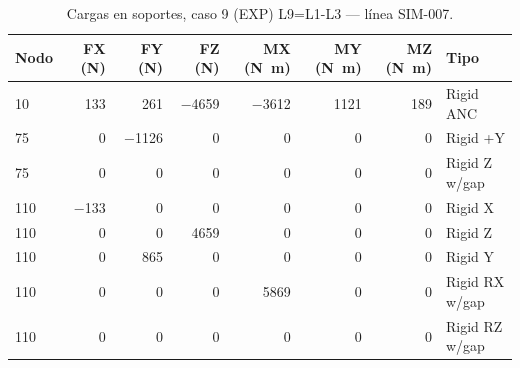 \begin{table}[htbp]
  \centering
  \footnotesize
  \caption{Cargas en soportes, caso 9 (EXP) L9=L1-L3 — línea SIM-007.}
  \label{tab:restricciones-exp}
  \begin{tabular}{lrrrrrrl}
    \toprule
    Nodo & FX (\si{N}) & FY (\si{N}) & FZ (\si{N}) & MX (\si{N.m}) & MY (\si{N.m}) & MZ (\si{N.m}) & Tipo \\
    \midrule
    10 & \num{133} & \num{261} & \num{-4659} & \num{-3612} & \num{1121} & \num{189} & Rigid ANC \\
    75 & \num{0} & \num{-1126} & \num{0} & \num{0} & \num{0} & \num{0} & Rigid +Y \\
    75 & \num{0} & \num{0} & \num{0} & \num{0} & \num{0} & \num{0} & Rigid Z w/gap \\
    110 & \num{-133} & \num{0} & \num{0} & \num{0} & \num{0} & \num{0} & Rigid X \\
    110 & \num{0} & \num{0} & \num{4659} & \num{0} & \num{0} & \num{0} & Rigid Z \\
    110 & \num{0} & \num{865} & \num{0} & \num{0} & \num{0} & \num{0} & Rigid Y \\
    110 & \num{0} & \num{0} & \num{0} & \num{5869} & \num{0} & \num{0} & Rigid RX w/gap \\
    110 & \num{0} & \num{0} & \num{0} & \num{0} & \num{0} & \num{0} & Rigid RZ w/gap \\
    \bottomrule
  \end{tabular}
\end{table}

